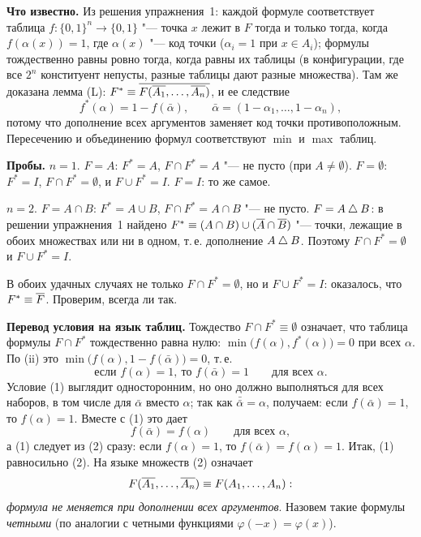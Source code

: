 \begin{solution}[3 (\S\,3)]
\textbf{Что известно.} Из решения упражнения~1: каждой формуле
соответствует таблица $f\colon\{0,1\}^n\to\{0,1\}$ "--- точка $x$ лежит в $F$
тогда и только тогда, когда $f(\alpha(x))=1$, где $\alpha(x)$ "--- код точки
($\alpha_i=1$ при $x\in A_i$); формулы тождественно равны ровно тогда, когда
равны их таблицы (в конфигурации, где все $2^n$ конституент непусты, разные
таблицы дают разные множества). Там же доказана лемма
(L): $F^*\equiv\overline{F(\overline{A_1},\dots,\overline{A_n})}$, и ее следствие
\begin{equation*}\tag{ii}
f^*(\alpha)=1-f(\bar\alpha),\qquad \bar\alpha=(1-\alpha_1,\dots,1-\alpha_n),
\end{equation*}
потому что дополнение всех аргументов заменяет код точки противоположным.
Пересечению и объединению формул соответствуют $\min$ и $\max$ таблиц.

\textbf{Пробы.} $n=1$. $F=A$: $F^*=A$, $F\cap F^*=A$ "--- не пусто (при
$A\ne\emptyset$). $F=\emptyset$: $F^*=I$, $F\cap F^*=\emptyset$, и
$F\cup F^*=I$. $F=I$: то же самое.

$n=2$. $F=A\cap B$: $F^*=A\cup B$, $F\cap F^*=A\cap B$ "--- не пусто.
$F=A\mathbin{\triangle} B$: в решении упражнения~1 найдено $F^*\equiv(A\cap B)\cup(\overline{A}\cap\overline{B})$
"--- точки, лежащие в обоих множествах или ни в одном, т.\,е. дополнение
$A\mathbin{\triangle} B$. Поэтому $F\cap F^*=\emptyset$ и $F\cup F^*=I$.

В обоих удачных случаях не только $F\cap F^*=\emptyset$, но и $F\cup F^*=I$:
оказалось, что $F^*\equiv\overline{F}$. Проверим, всегда ли так.

\textbf{Перевод условия на язык таблиц.} Тождество $F\cap F^*\equiv\emptyset$
означает, что таблица формулы $F\cap F^*$ тождественно равна нулю:
$\min\bigl(f(\alpha),f^*(\alpha)\bigr)=0$ при всех $\alpha$. По (ii) это
$\min\bigl(f(\alpha),1-f(\bar\alpha)\bigr)=0$, т.\,е.
\begin{equation*}\tag{1}
\text{если } f(\alpha)=1,\ \text{то } f(\bar\alpha)=1\qquad\text{для всех }\alpha .
\end{equation*}
Условие (1) выглядит односторонним, но оно должно выполняться для всех
наборов, в том числе для $\bar\alpha$ вместо $\alpha$; так как
$\bar{\bar\alpha}=\alpha$, получаем: если $f(\bar\alpha)=1$, то $f(\alpha)=1$.
Вместе с (1) это дает
\begin{equation*}\tag{2}
f(\bar\alpha)=f(\alpha)\qquad\text{для всех }\alpha ,
\end{equation*}
а (1) следует из (2) сразу: если $f(\alpha)=1$, то
$f(\bar\alpha)=f(\alpha)=1$. Итак, (1) равносильно (2). На языке множеств
(2) означает
\[
F(\overline{A_1},\dots,\overline{A_n})\equiv F(A_1,\dots,A_n):
\]
\emph{формула не меняется при дополнении всех аргументов}. Назовем такие
формулы \emph{четными} (по аналогии с четными функциями $\varphi(-x)=\varphi(x)$).


\end{solution}
